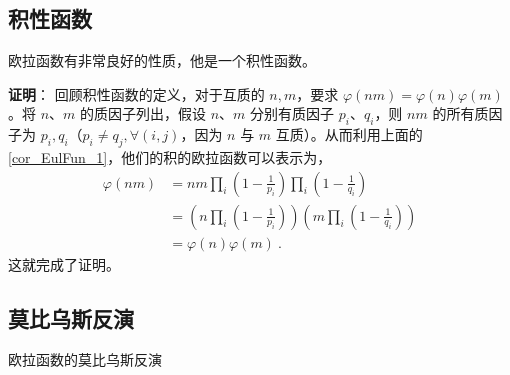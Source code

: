 \subsection{积性函数}
\begin{theorem}{}
欧拉函数有非常良好的性质，他是一个积性函数。
\end{theorem}
\textbf{证明}：
回顾积性函数的定义，对于互质的 $n, m$，要求 $\varphi(n m ) = \varphi(n) \varphi(m)$。将 $n$、$m$ 的质因子列出，假设 $n$、$m$ 分别有质因子 $p_i$、$q_i$，则 $nm$ 的所有质因子为 $p_i, q_i$（$p_i \neq q_j, \forall (i, j)$，因为 $n$ 与 $m$ 互质）。从而利用上面的\autoref{cor_EulFun_1}，他们的积的欧拉函数可以表示为，
\begin{equation}
\begin{aligned}
\varphi(n m) &= nm \prod_i \left(1-\frac1{p_i}\right) \prod_i \left(1-\frac1{q_i}\right)\\
&= \left(n \prod_i \left(1 - \frac1{p_i}\right)\right) \left(m \prod_i \left(1 - \frac1{q_i}\right)\right)\\
&= \varphi(n) \varphi(m) ~.
\end{aligned}
\end{equation}
这就完成了证明。

\subsection{莫比乌斯反演}
\begin{theorem}{欧拉函数的莫比乌斯反演}

\end{theorem}